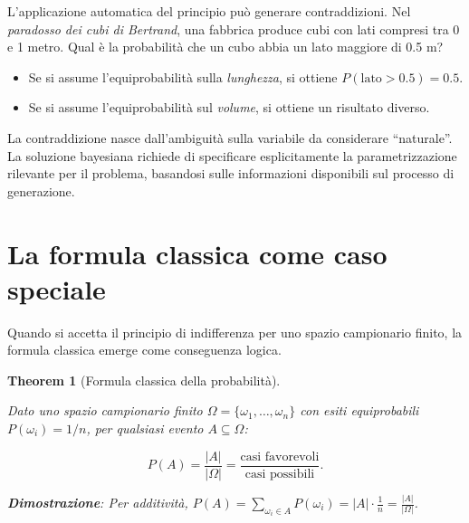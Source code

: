 \documentclass[
  letterpaper,
  DIV=11,
  numbers=noendperiod,
  oneside]{scrreprt}
\providecommand{\tightlist}{%
  \setlength{\itemsep}{0pt}\setlength{\parskip}{0pt}}
\theoremstyle{definition}
\theoremstyle{plain}
\newtheorem{theorem}{Theorem}[chapter]
\theoremstyle{definition}
\theoremstyle{remark}
\begin{document}
\begin{tcolorbox}[enhanced jigsaw, arc=.35mm, breakable, colbacktitle=quarto-callout-warning-color!10!white, opacityback=0, toprule=.15mm, rightrule=.15mm, colback=white, opacitybacktitle=0.6, leftrule=.75mm, coltitle=black, bottomtitle=1mm, left=2mm, toptitle=1mm, title=\textcolor{quarto-callout-warning-color}{\faExclamationTriangle}\hspace{0.5em}{Attenzione: il paradosso di Bertrand}, titlerule=0mm, bottomrule=.15mm, colframe=quarto-callout-warning-color-frame]

L'applicazione automatica del principio può generare contraddizioni. Nel
\emph{paradosso dei cubi di Bertrand}, una fabbrica produce cubi con
lati compresi tra 0 e 1 metro. Qual è la probabilità che un cubo abbia
un lato maggiore di 0.5 m?

\begin{itemize}
\tightlist
\item
  Se si assume l'equiprobabilità sulla \emph{lunghezza}, si ottiene
  \(P(\text{lato} > 0.5) = 0.5\).
\item
  Se si assume l'equiprobabilità sul \emph{volume}, si ottiene un
  risultato diverso.
\end{itemize}

La contraddizione nasce dall'ambiguità sulla variabile da considerare
``naturale''. La soluzione bayesiana richiede di specificare
esplicitamente la parametrizzazione rilevante per il problema, basandosi
sulle informazioni disponibili sul processo di generazione.

\end{tcolorbox}

\section{La formula classica come caso
speciale}\label{la-formula-classica-come-caso-speciale}

Quando si accetta il principio di indifferenza per uno spazio
campionario finito, la formula classica emerge come conseguenza logica.

\begin{theorem}[Formula classica della
probabilità]\protect\hypertarget{thm-classical-formula}{}\label{thm-classical-formula}

Dato uno spazio campionario finito
\(\Omega = \{\omega_1, \ldots, \omega_n\}\) con esiti equiprobabili
\(P(\omega_i) = 1/n\), per qualsiasi evento \(A \subseteq \Omega\):

\[
P(A) = \frac{|A|}{|\Omega|} = \frac{\text{casi favorevoli}}{\text{casi possibili}}.
\]

\textbf{Dimostrazione}: Per additività,
\(P(A) = \sum_{\omega_i \in A} P(\omega_i) = |A| \cdot \frac{1}{n} = \frac{|A|}{|\Omega|}\).

\end{theorem}
\end{document}
